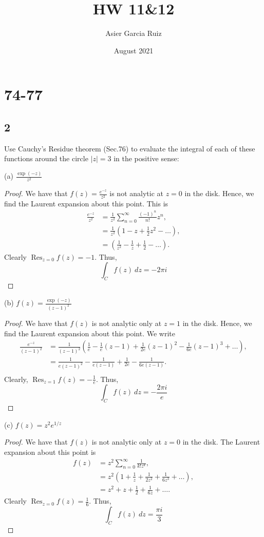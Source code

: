 \documentclass{article}
\title{HW 11\&12}
\author{Asier Garcia Ruiz }
\date{August 2021}
\DeclareMathOperator*{\Res}{Res}
\begin{document}
\maketitle


\section*{74-77}
\subsection*{2}
Use Cauchy's Residue theorem (Sec.76) to evaluate the integral of each of these
functions around the circle $|z|=3$ in the positive sense:

(a) $\frac{\exp(-z)}{z^2}$
\begin{proof}
    We have that $f(z) = \frac{e^{-z}}{z^2}$ is not analytic at $z = 0$ in the disk.
    Hence, we find the Laurent expansion about this point. This is
    \begin{align*}
        \frac{e^{-z}}{z^2} & = \frac{1}{z^2}\sum_{n=0}^\infty \frac{(-1)^n}{n!}z^n,       \\
                           & = \frac{1}{z^2}\left(1 - z + \frac{1}{2}z^2 - \dots \right), \\
                           & = (\frac{1}{z^2} - \frac{1}{z} + \frac{1}{2} - \dots).
    \end{align*}
    Clearly $\Res_{z=0} f(z) = -1$. Thus,
    \[\int_C f(z) \ dz = -2\pi i\]
\end{proof}

(b) $f(z) = \frac{\exp(-z)}{(z-1)^2}$
\begin{proof}
    We have that $f(z)$ is not analytic only at $z = 1$ in the disk. Hence,
    we find the Laurent expansion about this point. We write
    \begin{align*}
        \frac{e^{-z}}{(z-1)^2} & = \frac{1}{(z-1)^2}
        (\frac{1}{e} - \frac{1}{e}(z-1) + \frac{1}{2e}(z-1)^2 - \frac{1}{6e}(z-1)^3 + \dots),                \\
                               & = \frac{1}{e(z-1)^2} - \frac{1}{e(z-1)} + \frac{1}{2e} - \frac{1}{6e(z-1)}. \\
    \end{align*}
    Clearly, $\Res_{z=1} f(z) = -\frac{1}{e}$. Thus,
    \[\int_C f(z) \ dz = -\frac{2\pi i}{e}\]
\end{proof}

(c) $f(z) = z^2 e^{1/z}$
\begin{proof}
    We have that $f(z)$ is not analytic only at $z=0$ in the disk. The Laurent
    expansion about this point is
    \begin{align*}
        f(z) & = z^2\sum_{n=0}^\infty \frac{1}{k!z^k},                           \\
             & = z^2(1 + \frac{1}{z} + \frac{1}{2z^2} + \frac{1}{6z^3} + \dots), \\
             & = z^2 + z + \frac{1}{2} + \frac{1}{6z} + \dots.
    \end{align*}
    Clearly $\Res_{z=0} f(z) = \frac{1}{6}$. Thus,
    \[\int_C f(z) \ dz = \frac{\pi i}{3}\]
\end{proof}
\end{document}
